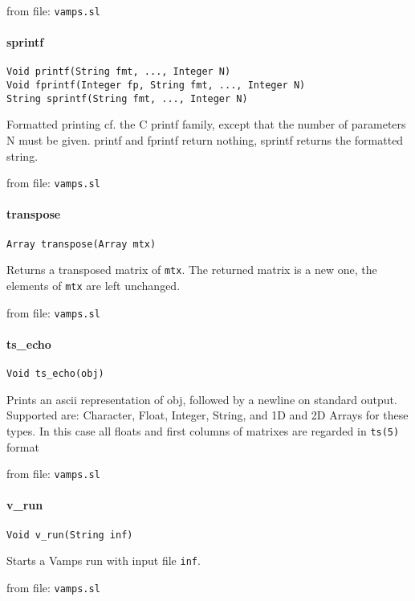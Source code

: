 from file: {\tt vamps.sl}


\paragraph{sprintf}
\begin{verbatim}
Void printf(String fmt, ..., Integer N)
Void fprintf(Integer fp, String fmt, ..., Integer N)
String sprintf(String fmt, ..., Integer N)
\end{verbatim}
Formatted printing cf. the C printf family, except that
the number of parameters N must be given. printf and
fprintf return nothing, sprintf returns the formatted
string.

from file: {\tt vamps.sl}


\paragraph{transpose}
\begin{verbatim}
Array transpose(Array mtx)
\end{verbatim}
Returns a transposed matrix of {\tt mtx}. The returned matrix is
a new one, the elements of {\tt mtx} are left unchanged.

from file: {\tt vamps.sl}


\paragraph{ts\_echo}
\begin{verbatim}
Void ts_echo(obj)
\end{verbatim}
Prints an ascii representation of obj, followed by a newline
on standard output. Supported are: Character, Float, Integer,
String, and 1D and 2D Arrays for these types. In this case
all floats and first columns of matrixes are regarded in {\tt ts(5)}
format

from file: {\tt vamps.sl}


\paragraph{v\_run}
\begin{verbatim}
Void v_run(String inf)
\end{verbatim}
Starts a Vamps run with input file {\tt inf}.

from file: {\tt vamps.sl}

